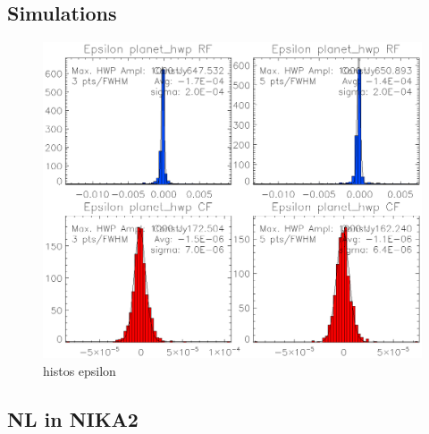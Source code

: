 %

\subsection{Simulations}

\begin{figure}
	\includegraphics[clip, angle=0, width=\columnwidth]{Figures/histos_epsilon.eps}
	\caption{histos epsilon}
	\label{fig:histos_epsilon}
\end{figure}

\subsection{NL in NIKA2}
